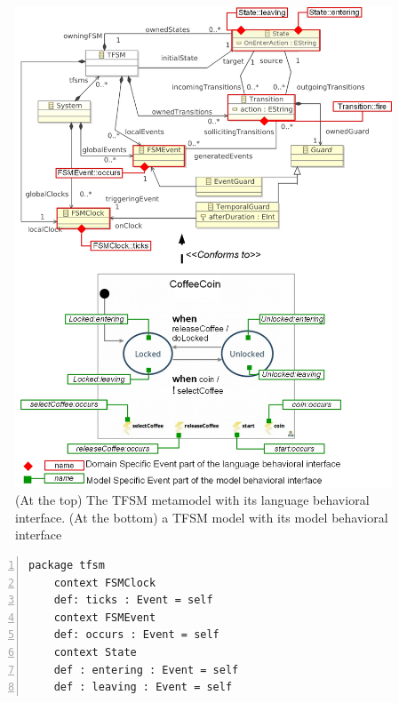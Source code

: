 	\begin{figure}
		\begin{center}
			\includegraphics[width=1\textwidth]{bcool/figs/tfsmmm.jpg}
			\caption{(At the top) The TFSM metamodel with its language behavioral interface. (At the bottom) a TFSM model with its model behavioral interface}
			\label{fig:tfsmmm}
		\end{center}
	\end{figure}
	
	\begin{lstlisting}[language=ecl,
	caption={Partial \ecl specification of TFSM},
	label={fig:tfsmmmecl}, 
	basicstyle=\scriptsize\ttfamily, backgroundcolor=\color{LGrey}, numbers=left, xleftmargin=3pt]
	package tfsm
	context FSMClock
	def: ticks : Event = self
	context FSMEvent
	def: occurs : Event = self
	context State
	def : entering : Event = self
	def : leaving : Event = self
	\end{lstlisting}
	
